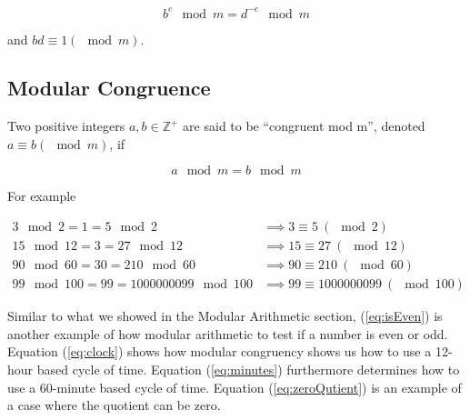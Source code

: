 \documentclass{article}
\renewcommand{\_}{\ifincsname_\else\legacyunderscore\fi}
\begin{document}
        \begin{equation}
            b^e \mod m = d^{-e} \mod m
        \end{equation}

        and $b d \equiv 1 (\mod m)$.

    \subsection{Modular Congruence}    

        Two positive integers $a, b \in \mathbb{Z}^+$ are said to be ``congruent mod m'', denoted $a \equiv b (\mod m)$, if 

        \begin{equation}
            a \mod m = b \mod m
        \end{equation}

        For example

        \begin{align}
            \label{eq:isEven}      3 \mod 2 = 1 = 5 \mod 2 &\implies 3 \equiv 5 \ (\mod 2) \\
            \label{eq:clock}       15 \mod 12 = 3 = 27 \mod 12 &\implies 15 \equiv 27 \ (\mod 12) \\
            \label{eq:minutes}     90 \mod 60 = 30 = 210 \mod 60 &\implies 90 \equiv 210 \ (\mod 60) \\
            \label{eq:zeroQutient} 99 \mod 100 = 99 = 1000000099 \mod 100 &\implies 99 \equiv 1000000099 \ (\mod 100)
        \end{align}

        Similar to what we showed in the Modular Arithmetic section, (\ref{eq:isEven}) is another example of how modular arithmetic to test if a number is even or odd.  Equation (\ref{eq:clock}) shows how modular congruency shows us how to use a 12-hour based cycle of time.  Equation (\ref{eq:minutes}) furthermore determines how to use a 60-minute based cycle of time.  Equation (\ref{eq:zeroQutient}) is an example of a case where the quotient can be zero.
\end{document}

